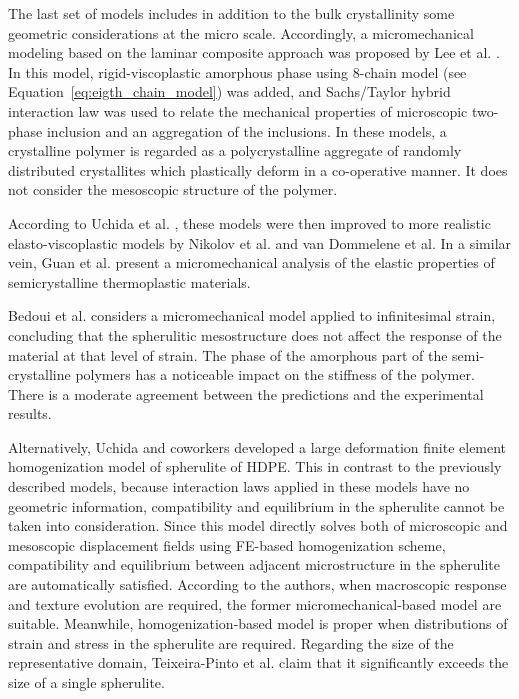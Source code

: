 The last set of models includes in addition to the bulk crystallinity some geometric considerations at the micro scale.
Accordingly, a micromechanical modeling based on the laminar composite approach was proposed by Lee et al. \citep{leeMicromechanicalModelingLarge1993, leeSimulationLargeStrain1993}.
In this model, rigid-viscoplastic amorphous phase using 8-chain model (see Equation~\eqref{eq:eigth_chain_model}) was added, and Sachs/Taylor hybrid interaction law was used to relate the mechanical properties of microscopic two-phase inclusion and an aggregation of the inclusions.
In these models, a crystalline polymer is regarded as a polycrystalline aggregate of randomly distributed crystallites which plastically deform in a co-operative manner.
It does not consider the mesoscopic structure of the polymer.

According to Uchida et al. \citep{uchidaMicroMesoMacroscopic2013}, these models were then improved to more realistic elasto-viscoplastic models by Nikolov et al. \citep{nikolovMicroMacroConstitutive2000, nikolovMultiscaleConstitutiveModeling2002, niko2006} and van Dommelene et al. \citep{vandommelenMicromechanicalModelingElastoviscoplastic2003}
In a similar vein, Guan et al. \citep{guanMicromechanicalModelElastic2004} present a micromechanical analysis of the elastic properties of semicrystalline thermoplastic materials.

Bedoui et al. \citep{bedouiMicromechanicalModelingIsotropic2006} considers a micromechanical model applied to infinitesimal strain, concluding that the spherulitic mesostructure does not affect the response of the material at that level of strain.
The phase of the amorphous part of the semi-crystalline polymers has a noticeable impact on the stiffness of the polymer.
There is a moderate agreement between the predictions and the experimental results.

Alternatively, Uchida and coworkers \citep{uchidaMicroMesoMacroscopic2013} developed a large deformation finite element homogenization model of spherulite of HDPE.
This in contrast to the previously described models, because interaction laws applied in these models have no geometric information, compatibility and equilibrium in the spherulite cannot be taken into consideration.
Since this model directly solves both of microscopic and mesoscopic displacement fields using FE-based homogenization scheme, compatibility and equilibrium between adjacent microstructure in the spherulite are automatically satisfied.
According to the authors, when macroscopic response and texture evolution are required, the former micromechanical-based model are suitable.
Meanwhile, homogenization-based model is proper when distributions of strain and stress in the spherulite are required.
Regarding the size of the representative domain, Teixeira-Pinto et al. \citep{teixeira-pintoSizeEstimationRepresentative2016} claim that it significantly exceeds the size of a single spherulite.


